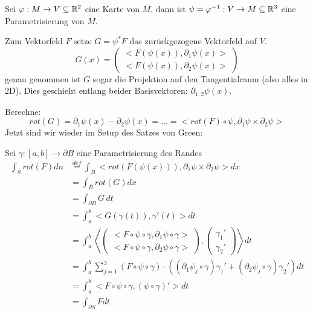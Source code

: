 \documentclass[main.tex]{subfiles}
\begin{document}
\begin{Beweis}
  Sei $\varphi: M \to V \subseteq \mathbb{R}^2$ eine Karte von $M$, dann ist $\psi = \varphi^{-1}: V \to M \subseteq \mathbb{R}^3$ eine Parametrisierung von $M$.

  Zum Vektorfeld $F$ setze $G = \psi^* F$ das zurückgezogene Vektorfeld auf $V$.
  $$G(x) = \begin{pmatrix}
    <F(\psi(x)),\partial_1 \psi(x)> \\ <F(\psi(x)), \partial_2 \psi(x)>
  \end{pmatrix}$$
  genau genommen ist $G$ sogar die Projektion auf den Tangentialraum (also alles in 2D). Dies geschieht entlang beider Basisvektoren: $\partial_{1,2} \psi(x)$.

  Berechne:
  $$rot(G) = \partial_1 \psi(x) - \partial_2 \psi(x) = ... = <rot(F) \circ \psi, \partial_1 \psi \times \partial_2 \psi>$$
  Jetzt sind wir wieder im Setup des Satzes von Green:

  Sei $\gamma:[a,b] \to \partial B$ eine Parametrisierung des Randes
  $$\begin{aligned}
    \int_S rot(F) dn & \stackrel{\scriptscriptstyle def}{=} \int_B <rot (F(\psi(x))),\partial_1 \psi \times \partial_2 \psi> dx \\
    & = \int_B rot(G) dx \\
    & = \int_{\partial B} G \, dt \\
    & = \int_a^b <G(\gamma(t)), \gamma'(t)> dt \\
    & = \int_a^b \left< \begin{pmatrix}
      <F \circ \psi \circ \gamma , \partial_1 \psi \circ \gamma> \\ <F \circ \psi \circ \gamma , \partial_2 \psi \circ \gamma>
    \end{pmatrix},\begin{pmatrix}
      \gamma_1' \\ \gamma_2'
    \end{pmatrix} \right> dt \\
    & = \int_a^b \sum \limits_{j=1}^3 (F \circ \psi \circ \gamma) \cdot \left((\partial_1 \psi_j \circ \gamma)\gamma_1' + (\partial_2 \psi_j \circ \gamma)\gamma_2'\right) dt \\
    & = \int_a^b <F \circ \psi \circ \gamma, (\psi \circ \gamma)'> dt \\
    & = \int_{\partial S} F dt
  \end{aligned}$$
\end{Beweis}
\end{document}
